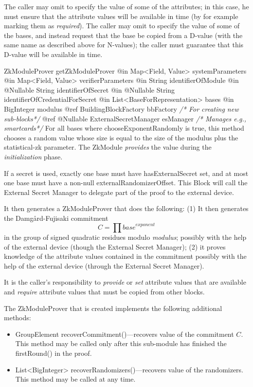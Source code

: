     The caller may omit to specify the value of some of the attributes; in this case, he must
    ensure that the attribute values will be available in time (by for example marking them as \emph{required}).
    The caller may omit to specify the value of some of the bases, and instead request
    that the base be copied from a D-value (with the same name as described above for N-values);
    the caller must guarantee that this D-value will be available in time.
      \begin{method}
      {ZkModuleProver}
      {getZkModuleProver}
      {
        {@in Map<Field, Value> systemParameters}
        {@in Map<Field, Value> verifierParameters}
        {@in String identifierOfModule}
        {@in @Nullable String identifierOfSecret}
        {@in @Nullable String identifierOfCredentialForSecret}
        {@in List<BaseForRepresentation> bases}
        {@in BigInteger modulus}
        {@ref BuildingBlockFactory bbFactory \textrm{\emph{/* For creating new sub-blocks*/}}}
        {@ref @Nullable ExternalSecretManager esManager \textrm{\emph{/* Manages e.g., smartcards*/}}}
      }
      For all bases where chooseExponentRandomly is true, this method chooses a random value whose size is
      equal to the size of the modulus plus the statistical-zk parameter.
      The ZkModule \emph{provides} the value during the \emph{initialization} phase.

      If a secret is used, exactly one base must have hasExternalSecret set, and at most one base must have a
      non-null externalRandomizerOffset. This Block will call the External Secret Manager to delegate part of
      the proof to the external device.

      It then generates a ZkModuleProver that does the following:
      (1) It then generates the Damg\aa{}rd-Fujisaki commitment $$C = \prod \textit{base}^\textit{exponent}$$
      in the group of signed quadratic residues modulo \textit{modulus};
      possibly with the help of the external device (though the External Secret Manager);
      (2) it proves knowledge of the attribute values contained in the commitment possibly with the help of the
      external device (through the External Secret Manager).


      It is the caller's responsibility to \emph{provide} or \emph{set} attribute values that are available and \emph{require}
      attribute values that must be copied from other blocks.

      The ZkModuleProver that is created implements the following additional methods:
        \begin{itemize}
          \item GroupElement recoverCommitment()---recovers value of the commitment $C$. This method may be called only after this sub-module
             has finished the firstRound() in the proof.
          \item List<BigInteger> recoverRandomizers()---recovers value of the randomizers. This method may be called at any time.
        \end{itemize}

      \end{method}
